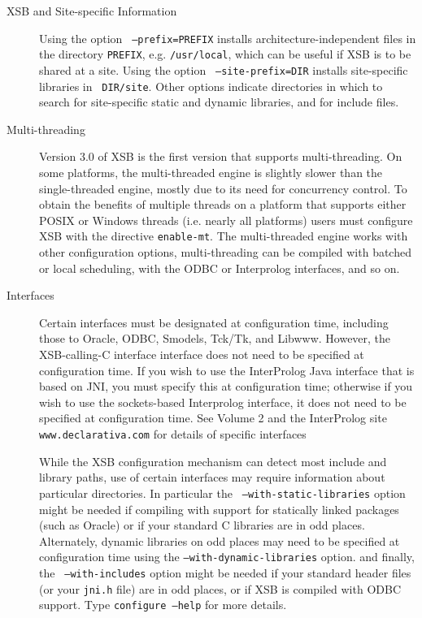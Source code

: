\begin{description}
\item[XSB and Site-specific Information] Using the option {\tt
  --prefix=PREFIX} installs architecture-independent files in the
  directory {\tt PREFIX}, e.g. {\tt /usr/local}, which can be useful
  if XSB is to be shared at a site.  Using the option {\tt
    --site-prefix=DIR} installs site-specific libraries in {\tt
    DIR/site}.  Other options indicate directories in which to search
  for site-specific static and dynamic libraries, and for include
  files.

\item[Multi-threading] Version 3.0 of XSB is the first version that
  supports multi-threading.  On some platforms, the multi-threaded
  engine is slightly slower than the single-threaded engine, mostly
  due to its need for concurrency control.  To obtain the benefits of
  multiple threads on a platform that supports either POSIX or Windows
  threads (i.e.  nearly all platforms) users must configure XSB with
  the directive {\tt enable-mt}.  The multi-threaded engine works with
  other configuration options, multi-threading can be compiled with
  batched or local scheduling, with the ODBC or Interprolog
  interfaces, and so on.


\item[Interfaces] Certain interfaces must be designated at
configuration time, including those to Oracle, ODBC, Smodels, Tck/Tk,
and Libwww.  However, the XSB-calling-C interface interface does not
need to be specified at configuration time.  If you wish to use the
InterProlog Java interface that is based on JNI, you must
specify this at configuration time; otherwise if you wish to use the
sockets-based Interprolog interface, it does not need to be specified
at configuration time.  See Volume 2 and the InterProlog site {\tt
www.declarativa.com} for details of specific interfaces

While the XSB configuration mechanism can detect most include and
library paths, use of certain interfaces may require information about
particular directories.  In particular the {\tt
--with-static-libraries} option might be needed if compiling with
support for statically linked packages (such as Oracle) or if your
standard C libraries are in odd places. Alternately, dynamic libraries
on odd places may need to be specified at configuration time using the
{\tt --with-dynamic-libraries} option.  and finally, the {\tt
--with-includes} option might be needed if your standard header files
(or your {\tt jni.h} file) are in odd places, or if XSB is compiled
with ODBC support.  Type {\tt configure --help} for more details.


\end{description}

